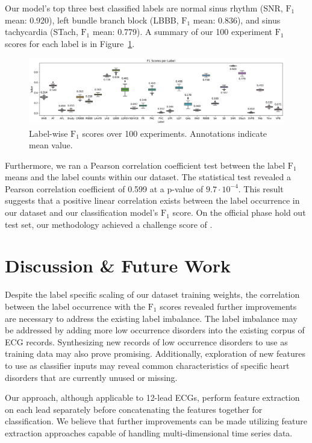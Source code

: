 \documentclass[twocolumn]{cinc}
\begin{document}
Our model's top three best classified labels are normal sinus rhythm (SNR, $\text{F}_1$ mean: 0.920), left bundle branch block (LBBB, $\text{F}_1$ mean: 0.836), and sinus tachycardia (STach, $\text{F}_1$ mean: 0.779).
A summary of our 100 experiment $\text{F}_1$ scores for each label is in Figure~\ref{fig:f1_score}.

\begin{figure}[ht]
  \centering
  \includegraphics[width=17.0cm]{fig/label_f1s.png}
  \caption{Label-wise $\text{F}_1$ scores over 100 experiments. Annotations indicate mean value.}
  \label{fig:f1_score}
\end{figure}

Furthermore, we ran a Pearson correlation coefficient test between the label $\text{F}_1$ means and the label counts within our dataset.
The statistical test revealed a Pearson correlation coefficient of 0.599 at a p-value of $9.7 \cdot 10^{-4}$.
This result suggests that a positive linear correlation exists between the label occurrence in our dataset and our classification model's $\text{F}_1$ score.
On the official phase hold out test set, our methodology achieved a challenge score of \officialscore.

\section{Discussion \& Future Work}

Despite the label specific scaling of our dataset training weights, the correlation between the label occurrence with the $\text{F}_1$ scores revealed further improvements are necessary to address the existing label imbalance.
The label imbalance may be addressed by adding more low occurrence disorders into the existing corpus of ECG records.
Synthesizing new records of low occurrence disorders to use as training data may also prove promising.
Additionally, exploration of new features to use as classifier inputs may reveal common characteristics of specific heart disorders that are currently unused or missing.

Our approach, although applicable to 12-lead ECGs, perform feature extraction on each lead separately before concatenating the features together for classification.
We believe that further improvements can be made utilizing feature extraction approaches capable of handling multi-dimensional time series data.
\end{document}
